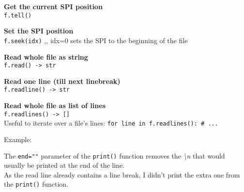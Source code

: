         \begin{indentblock}

            \textbf{Get the current SPI position} \\
            \texttt{f.tell()}

            \textbf{Set the SPI position} \\
            \texttt{f.seek(idx)} \sep{,}
            idx=0 sets the SPI to the beginning of the file

            \textbf{Read whole file as string} \\
            \texttt{f.read() -> str}

            \textbf{Read one line (till next linebreak)} \\
            \texttt{f.readline() -> str}

            \textbf{Read whole file as list of lines} \\
            \texttt{f.readlines() -> []} \\
            Useful to iterate over a file's lines: \texttt{for line in f.readlines(): # ...}

        \end{indentblock}

        Example:

        The \texttt{end=""} parameter of the \texttt{print()} function
        removes the \textit{\textbackslash n} that would usually be printed at the end of the line. \\
        As the read line already contains a line break, I didn't print the extra one from the
        \texttt{print()} function.
